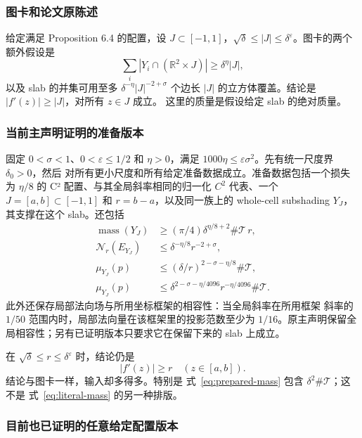 \documentclass[UTF8,11pt,a4paper,fontset=none]{ctexart}
\newcommand{\R}{\mathbb R}
\newcommand{\T}{\mathcal T}
\newcommand{\eps}{\varepsilon}
\newcommand{\mass}{\operatorname{mass}}
\newcommand{\N}{\mathcal N}
\begin{document}
\subsubsection{图卡和论文原陈述}

给定满足 Proposition 6.4 的配置，设
$J\subset[-1,1]$，$\sqrt\delta\leq|J|\leq\delta^\eps$。图卡的两个
额外假设是
\begin{equation}\label{eq:literal-mass}
 \sum_i|Y_i\cap(\R^2\times J)|\geq\delta^\eta|J|,
\end{equation}
以及 slab 的并集可用至多 $\delta^{-\eta}|J|^{-2+\sigma}$ 个边长
$|J|$ 的立方体覆盖。结论是 $|f'(z)|\geq|J|$，对所有 $z\in J$ 成立。
这里的质量是假设给定 slab 的绝对质量。

\subsubsection{当前主声明证明的准备版本}

固定 $0<\sigma<1$、$0<\eps\leq1/2$ 和 $\eta>0$，满足
$1000\eta\leq\eps\sigma^2$。先有统一尺度界 $\delta_0>0$，然后
对所有更小尺度和所有给定准备数据成立。准备数据包括一个损失为
$\eta/8$ 的 C² 配置、与其全局斜率相同的归一化 $C^2$ 代表、一个
$J=[a,b]\subset[-1,1]$ 和 $r=b-a$，以及同一族上的 whole-cell
subshading $Y_J$，其支撑在这个 slab。还包括
\begin{align}
 \mass(Y_J)&\geq (\pi/4)\delta^{\eta/8+2}\#\T\,r,
                                      \label{eq:prepared-mass}\\
 \N_r(E_{Y_J})&\leq\delta^{-\eta/8}r^{-2+\sigma},
                                      \label{eq:prepared-cover}\\
 \mu_{Y_J}(p)&\leq(\delta/r)^{2-\sigma-\eta/8}\#\T,
                                      \label{eq:prepared-cap1}\\
 \mu_{Y_J}(p)&\leq\delta^{2-\sigma-\eta/4096}
                      r^{-\eta/4096}\#\T.\label{eq:prepared-cap2}
\end{align}
此外还保存局部法向场与所用坐标框架的相容性：当全局斜率在所用框架
斜率的 $1/50$ 范围内时，局部法向量在该框架里的投影范数至少为
$1/16$。原主声明保留全局相容性；另有已证明版本只要求它在保留下来的
slab 上成立。

在 $\sqrt\delta\leq r\leq\delta^\eps$ 时，结论仍是
\[
 |f'(z)|\geq r\quad(z\in[a,b]).
\]
结论与图卡一样，输入却多得多。特别是
式~\eqref{eq:prepared-mass} 包含 $\delta^2\#\T$；这不是
式~\eqref{eq:literal-mass} 的另一种排版。

\subsubsection{目前也已证明的任意给定配置版本}
\end{document}
